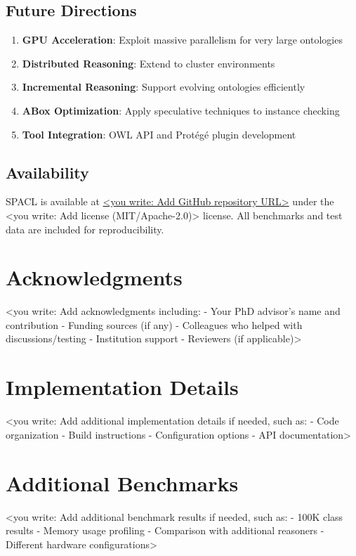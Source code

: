 \documentclass[preprint,12pt]{elsarticle}
\begin{document}
\subsection{Future Directions}
\label{sec:future}

\begin{enumerate}
    \item \textbf{GPU Acceleration}: Exploit massive parallelism for very large ontologies
    \item \textbf{Distributed Reasoning}: Extend to cluster environments
    \item \textbf{Incremental Reasoning}: Support evolving ontologies efficiently
    \item \textbf{ABox Optimization}: Apply speculative techniques to instance checking
    \item \textbf{Tool Integration}: OWL API and Protégé plugin development
\end{enumerate}

\subsection{Availability}
\label{sec:availability}

SPACL is available at \url{<you write: Add GitHub repository URL>} under the <you write: Add license (MIT/Apache-2.0)> license. All benchmarks and test data are included for reproducibility.

\section*{Acknowledgments}
\label{sec:ack}

<you write: Add acknowledgments including:
- Your PhD advisor's name and contribution
- Funding sources (if any)
- Colleagues who helped with discussions/testing
- Institution support
- Reviewers (if applicable)>




\appendix
\section{Implementation Details}
\label{app:implementation}

<you write: Add additional implementation details if needed, such as:
- Code organization
- Build instructions
- Configuration options
- API documentation>

\section{Additional Benchmarks}
\label{app:benchmarks}

<you write: Add additional benchmark results if needed, such as:
- 100K class results
- Memory usage profiling
- Comparison with additional reasoners
- Different hardware configurations>
\end{document}
